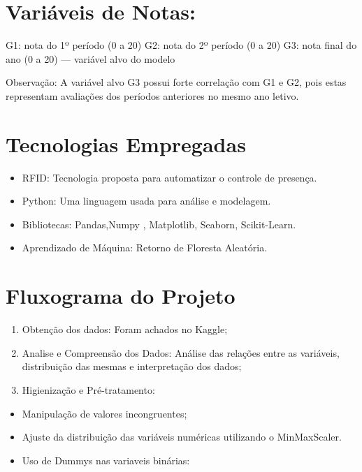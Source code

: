 \documentclass[
  letterpaper,
  DIV=11,
  numbers=noendperiod,
  openany]{scrreprt}
\providecommand{\tightlist}{%
  \setlength{\itemsep}{0pt}\setlength{\parskip}{0pt}}
\begin{document}
\section{Variáveis de Notas:}\label{variuxe1veis-de-notas}

G1: nota do 1º período (0 a 20) G2: nota do 2º período (0 a 20) G3: nota
final do ano (0 a 20) --- variável alvo do modelo

Observação: A variável alvo G3 possui forte correlação com G1 e G2, pois
estas representam avaliações dos períodos anteriores no mesmo ano
letivo.

\section{Tecnologias Empregadas}\label{tecnologias-empregadas}

\begin{itemize}
\tightlist
\item
  RFID: Tecnologia proposta para automatizar o controle de presença.
\item
  Python: Uma linguagem usada para análise e modelagem.
\item
  Bibliotecas: Pandas,Numpy , Matplotlib, Seaborn, Scikit-Learn.
\item
  Aprendizado de Máquina: Retorno de Floresta Aleatória.
\end{itemize}

\section{Fluxograma do Projeto}\label{fluxograma-do-projeto}

\begin{enumerate}
\def\labelenumi{\arabic{enumi}.}
\item
  Obtenção dos dados: Foram achados no Kaggle;
\item
  Analise e Compreensão dos Dados: Análise das relações entre as
  variáveis, distribuição das mesmas e interpretação dos dados;
\item
  Higienização e Pré-tratamento:
\end{enumerate}

\begin{itemize}
\item
  Manipulação de valores incongruentes;
\item
  Ajuste da distribuição das variáveis numéricas utilizando o
  MinMaxScaler.
\item
  Uso de Dummys nas variaveis binárias:
\end{itemize}
\end{document}
